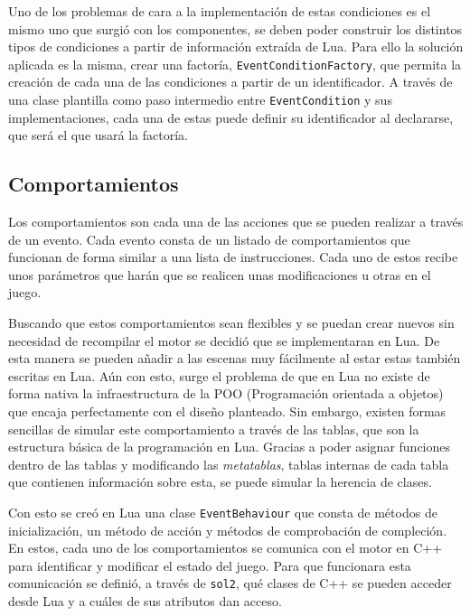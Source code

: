 \medskip

Uno de los problemas de cara a la implementación de estas condiciones es el mismo uno que surgió con los componentes, se deben poder construir los distintos tipos de condiciones a partir de información extraída de Lua. Para ello la solución aplicada es la misma, crear una factoría, \texttt{EventConditionFactory}, que permita la creación de cada una de las condiciones a partir de un identificador. A través de una clase plantilla como paso intermedio entre \texttt{EventCondition} y sus implementaciones, cada una de estas puede definir su identificador al declararse, que será el que usará la factoría. 

\subsection{Comportamientos}
Los comportamientos son cada una de las acciones que se pueden realizar a través de un evento. Cada evento consta de un listado de comportamientos que funcionan de forma similar a una lista de instrucciones. Cada uno de estos recibe unos parámetros que harán que se realicen unas modificaciones u otras en el juego.

\medskip

Buscando que estos comportamientos sean flexibles y se puedan crear nuevos sin necesidad de recompilar el motor se decidió que se implementaran en Lua. De esta manera se pueden añadir a las escenas muy fácilmente al estar estas también escritas en Lua. Aún con esto, surge el problema de que en Lua no existe de forma nativa la infraestructura de la POO (Programación orientada a objetos) que encaja perfectamente con el diseño planteado. Sin embargo, existen formas sencillas de simular este comportamiento a través de las tablas, que son la estructura básica de la programación en Lua. Gracias a poder asignar funciones dentro de las tablas y modificando las \textit{metatablas}, tablas internas de cada tabla que contienen información sobre esta, se puede simular la herencia de clases.

\medskip

Con esto se creó en Lua una clase \texttt{EventBehaviour} que consta de métodos de inicialización, un método de acción y métodos de comprobación de compleción. En estos, cada uno de los comportamientos se comunica con el motor en C++ para identificar y modificar el estado del juego. Para que funcionara esta comunicación se definió, a través de \texttt{sol2}, qué clases de C++ se pueden acceder desde Lua y a cuáles de sus atributos dan acceso.

